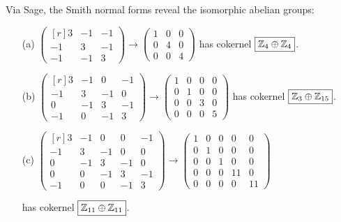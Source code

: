\documentclass[../algebraNotesMSRI-UP2016.tex]{subfiles}
\begin{document}
\begin{frame}
Via Sage, the Smith normal forms reveal the isomorphic abelian groups:
\begin{itemize}
\item[(a)] $\begin{pmatrix*}[r]
	3 & -1 & -1 \\
	-1 & 3 & -1 \\
	-1 & -1 & 3
	\end{pmatrix*}\to 
	\begin{pmatrix}
	1 & 0 & 0 \\
	0 & 4 & 0 \\
	0 & 0 & 4
	\end{pmatrix}$ has cokernel $\boxed{\mathbb Z_4\oplus \mathbb Z_4}$.
	
\smallGap	
\item[(b)] $\begin{pmatrix*}[r]
	3 & -1 & 0 & -1 \\
	-1 & 3 & -1 & 0 \\
	0 & -1 & 3 & -1 \\
	-1 & 0 & -1 & 3
	\end{pmatrix*}\to
	\begin{pmatrix}
	1 & 0 & 0 & 0 \\
	0 & 1 & 0 & 0 \\
	0 & 0 & 3 & 0 \\
	0 & 0 & 0 & 5
	\end{pmatrix}$ has cokernel $\boxed{\mathbb Z_3\oplus \mathbb Z_{15}}$.	

\smallGap
\item[(c)] $\begin{pmatrix*}[r]
	3 & -1 & 0 & 0 & -1 \\
	-1 & 3 & -1 & 0 & 0 \\
	0 & -1 & 3 & -1 & 0 \\
	0 & 0 & -1 & 3 & -1 \\
	-1 & 0 & 0 & -1 & 3
	\end{pmatrix*}\to
	\begin{pmatrix}
	1 & 0 & 0 & 0 & 0 \\
	0 & 1 & 0 & 0 & 0 \\
	0 & 0 & 1 & 0 & 0 \\
	0 & 0 & 0 & 11 & 0 \\
	0 & 0 & 0 & 0 & 11
	\end{pmatrix}$ 
	
	has cokernel $\boxed{\mathbb Z_{11}\oplus \mathbb Z_{11}}$.
\end{itemize}
\end{frame}
\end{document}
